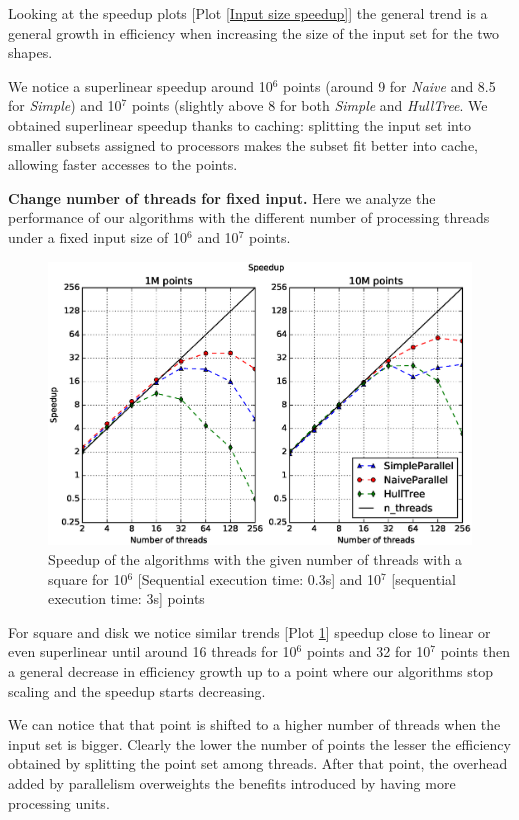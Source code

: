 \documentclass[letterpaper]{article}
\newcommand{\mypar}[1]{{\bf #1.}}
\theoremstyle{definition}
\begin{document}
Looking at the speedup plots [Plot \ref{Input size speedup}] the general trend is a general growth in efficiency when increasing the size of the input set for the two shapes.

We notice a superlinear speedup around 10$^6$ points (around 9 for \textit{Naive} and 8.5 for \textit{Simple}) and 10$^7$ points (slightly above 8 for both \textit{Simple} and \textit{HullTree}.
We obtained superlinear speedup thanks to caching: splitting the input set into smaller subsets assigned to processors makes the subset fit better into cache, allowing faster accesses to the points.

\mypar{Change number of threads for fixed input}
Here we analyze the performance of our algorithms with the different number of processing threads under a fixed input size of 10$^6$ and 10$^7$ points.

\begin{figure}[!ht]\centering
  \includegraphics[scale=0.33]{./plots/speedup_xeon_square_fixed_points.eps}
  \caption{Speedup of the algorithms with the given number of threads with a square for 10$^6$ [Sequential execution time: 0.3s] and 10$^7$ [sequential execution time: 3s] points\label{Threads speedup square}}
\end{figure}

For square and disk we notice similar trends [Plot \ref{Threads speedup square}] speedup close to linear or even superlinear until around 16 threads for 10$^6$ points and 32 for 10$^7$ points then a general decrease in efficiency growth up to a point where our algorithms stop scaling and the speedup starts decreasing.

We can notice that that point is shifted to a higher number of threads when the input set is bigger. Clearly the lower the number of points the lesser the efficiency obtained by splitting the point set among threads.
After that point, the overhead added by parallelism overweights the benefits introduced by having more processing units.
\end{document}
